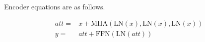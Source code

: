 Encoder equations are as follows.

\begin{equation}
\begin{split}
att = & x+ \mathrm{MHA}(\mathrm{LN}(x),\mathrm{LN}(x),\mathrm{LN}(x)) \\
y = & att+ \mathrm{FFN}(\mathrm{LN}(att))
\end{split}
\end{equation}



